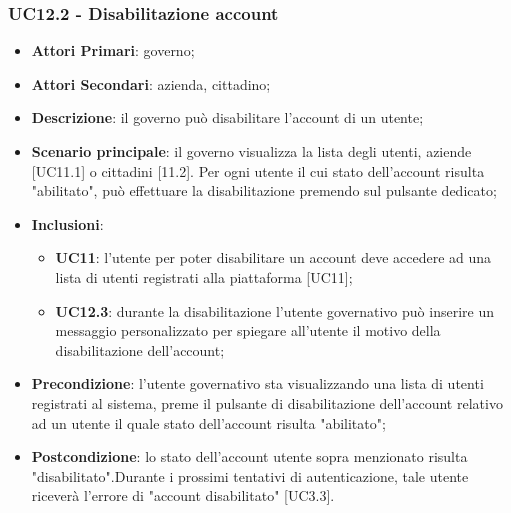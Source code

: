 \subsubsection{UC12.2 - Disabilitazione account}
\begin{itemize}
	\item \textbf{Attori Primari}:
	governo;
	\item \textbf{Attori Secondari}:
	azienda, cittadino;
	\item \textbf{Descrizione}: il governo può disabilitare l'account di un utente;
	\item \textbf{Scenario principale}: il governo visualizza la lista degli utenti, aziende [UC11.1] o cittadini [11.2]. Per ogni utente il cui stato dell'account risulta "abilitato", può effettuare la disabilitazione premendo sul pulsante dedicato;
	\item \textbf{Inclusioni}: 
	\begin{itemize}
		\item \textbf{UC11}: l'utente per poter disabilitare un account deve accedere ad una lista di utenti registrati alla piattaforma [UC11];
		\item \textbf{UC12.3}: durante la disabilitazione l'utente governativo può inserire un messaggio personalizzato per spiegare all'utente il motivo della disabilitazione dell'account;
	\end{itemize}
	\item \textbf{Precondizione}: l'utente governativo sta visualizzando una lista di utenti registrati al sistema, preme il pulsante di disabilitazione dell'account relativo ad un utente il quale stato dell'account risulta "abilitato";
	\item \textbf{Postcondizione}: lo stato  dell'account utente sopra menzionato risulta "disabilitato".Durante i prossimi tentativi di autenticazione, tale utente riceverà l'errore di "account disabilitato" [UC3.3].
\end{itemize} 


